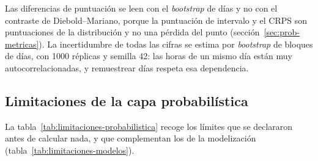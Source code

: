 Las diferencias de puntuación se leen con el \textit{bootstrap} de días y no
con el contraste de Diebold--Mariano, porque la puntuación de intervalo y el
CRPS son puntuaciones de la distribución y no una pérdida del punto
(sección~\ref{sec:prob-metricas}). La incertidumbre de todas las cifras se
estima por \textit{bootstrap} de bloques de días, con 1000 réplicas y
semilla 42: las horas de un mismo día están muy autocorrelacionadas, y
remuestrear días respeta esa dependencia.

\subsection{Limitaciones de la capa probabilística}\label{sec:prob-limites}

La tabla~\ref{tab:limitaciones-probabilistica} recoge los límites que se
declararon antes de calcular nada, y que complementan los de la modelización
(tabla~\ref{tab:limitaciones-modelos}).

